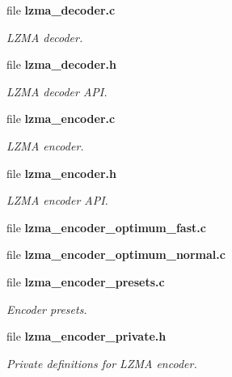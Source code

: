 \begin{DoxyCompactItemize}
file \textbf{ lzma\+\_\+decoder.\+c}
\begin{DoxyCompactList}\small\item\em L\+Z\+MA decoder. \end{DoxyCompactList}\item 
file \textbf{ lzma\+\_\+decoder.\+h}
\begin{DoxyCompactList}\small\item\em L\+Z\+MA decoder A\+PI. \end{DoxyCompactList}\item 
file \textbf{ lzma\+\_\+encoder.\+c}
\begin{DoxyCompactList}\small\item\em L\+Z\+MA encoder. \end{DoxyCompactList}\item 
file \textbf{ lzma\+\_\+encoder.\+h}
\begin{DoxyCompactList}\small\item\em L\+Z\+MA encoder A\+PI. \end{DoxyCompactList}\item 
file \textbf{ lzma\+\_\+encoder\+\_\+optimum\+\_\+fast.\+c}
\item 
file \textbf{ lzma\+\_\+encoder\+\_\+optimum\+\_\+normal.\+c}
\item 
file \textbf{ lzma\+\_\+encoder\+\_\+presets.\+c}
\begin{DoxyCompactList}\small\item\em Encoder presets. \end{DoxyCompactList}\item 
file \textbf{ lzma\+\_\+encoder\+\_\+private.\+h}
\begin{DoxyCompactList}\small\item\em Private definitions for L\+Z\+MA encoder. \end{DoxyCompactList}\end{DoxyCompactItemize}
